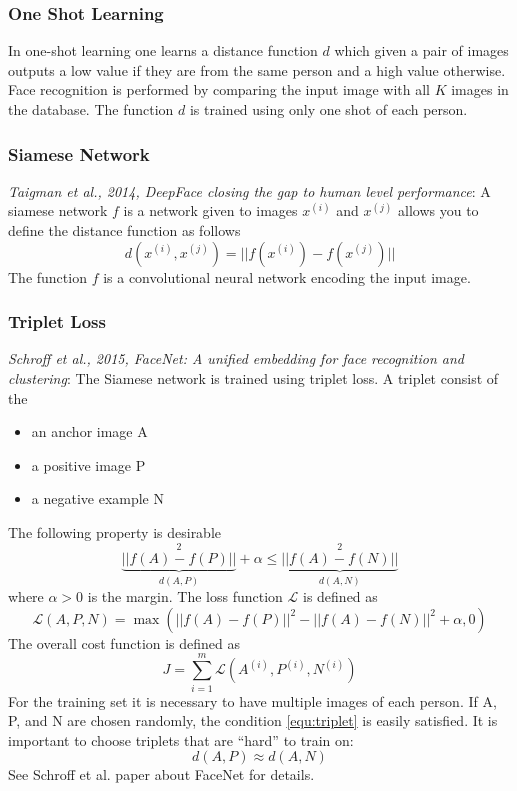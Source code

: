 \documentclass{article}
\begin{document}
\subsubsection{One Shot Learning}
In one-shot learning one learns a distance function $d$
which given a pair of images outputs a low value if they are from the same person and a high value otherwise.
Face recognition is performed by comparing the input image with all $K$ images in the database.
The function $d$ is trained using only one shot of each person.

\subsubsection{Siamese Network}
\emph{Taigman et al., 2014, DeepFace closing the gap to human level performance}:
A siamese network $f$ is a network given to images $x^{(i)}$ and $x^{(j)}$ allows you to define the distance function as follows
\begin{equation}
  d(x^{(i)},x^{(j)}) = ||f(x^{(i)})-f(x^{(j)})||
\end{equation}
The function $f$ is a convolutional neural network encoding the input image.

\subsubsection{Triplet Loss}
\emph{Schroff et al., 2015, FaceNet: A unified embedding for face recognition and clustering}:
The Siamese network is trained using triplet loss.
A triplet consist of the
\begin{itemize}
  \item an anchor image A
  \item a positive image P
  \item a negative example N
\end{itemize}
The following property is desirable
\begin{equation}\label{equ:triplet}
  \underbrace{||f(A)-f(P)||}_{d(A,P)}^2 + \alpha \le \underbrace{||f(A)-f(N)||}_{d(A,N)}^2
\end{equation}
where $\alpha>0$ is the margin.
The loss function $\mathcal{L}$ is defined as
\begin{equation}
  \mathcal{L}(A,P,N)=\max(||f(A)-f(P)||^2-||f(A)-f(N)||^2+\alpha, 0)
\end{equation}
The overall cost function is defined as
\begin{equation}
  J=\sum_{i=1}^m\mathcal{L}(A^{(i)},P^{(i)},N^{(i)})
\end{equation}
For the training set it is necessary to have multiple images of each person.
If A, P, and N are chosen randomly, the condition \cref{equ:triplet} is easily satisfied.
It is important to choose triplets that are ``hard'' to train on:
\begin{equation}
  d(A, P)\approx d(A, N)
\end{equation}
See Schroff et al. paper about FaceNet for details.
\end{document}
